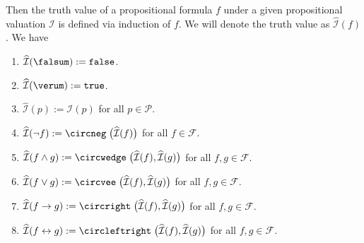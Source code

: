 \begin{table}[!ht]
  \centering
{}
  \caption{Interpretation of the propositional operators.}
  \label{tab:aussagen-logik}
\end{table}
Then the truth value of a propositional formula $f$ under a given propositional valuation $\mathcal{I}$ is
defined via induction of $f$.  We will denote the truth value as
$\widehat{\mathcal{I}}(f)$ .  We have
\begin{enumerate}
\item $\widehat{\mathcal{I}}(\falsum) := \texttt{false}$.
\item $\widehat{\mathcal{I}}(\verum) := \texttt{true}$.
\item $\widehat{\mathcal{I}}(p) := \mathcal{I}(p)$ for all $p \in \mathcal{P}$.
\item $\widehat{\mathcal{I}}(\neg f) := \circneg\;\bigl(\widehat{\mathcal{I}}(f)\bigr)$ for all $f \in \mathcal{F}$.
\item $\widehat{\mathcal{I}}(f \wedge g) := \circwedge\;\bigl(\widehat{\mathcal{I}}(f), \widehat{\mathcal{I}}(g)\bigr)$ 
      for all $f, g \in \mathcal{F}$.
\item $\widehat{\mathcal{I}}(f \vee g) := \circvee\;\bigl(\widehat{\mathcal{I}}(f), \widehat{\mathcal{I}}(g)\bigr)$ 
      for all $f, g \in \mathcal{F}$.
\item $\widehat{\mathcal{I}}(f \rightarrow g) := \circright\;\bigl(\widehat{\mathcal{I}}(f), \widehat{\mathcal{I}}(g)\bigr)$ 
      for all $f, g \in \mathcal{F}$.
\item $\widehat{\mathcal{I}}(f \leftrightarrow g) := \circleftright\;\bigl(\widehat{\mathcal{I}}(f), \widehat{\mathcal{I}}(g)\bigr)$ 
      for all $f, g \in \mathcal{F}$.
\end{enumerate}
